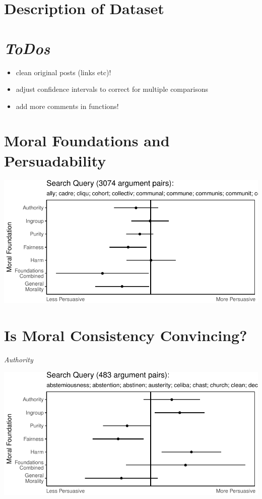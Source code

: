 \documentclass[11pt,]{article}
\providecommand{\tightlist}{%
\setlength{\itemsep}{0pt}\setlength{\parskip}{0pt}}
\begin{document}
\section{Description of Dataset}\label{description-of-dataset}

\section{\texorpdfstring{\emph{ToDos}}{ToDos}}\label{todos}

\begin{itemize}
\tightlist
\item
  clean original posts (links etc)!
\item
  adjust confidence intervals to correct for multiple comparisons
\item
  add more comments in functions!
\end{itemize}

\section{Moral Foundations and
Persuadability}\label{moral-foundations-and-persuadability}

\includegraphics{prelim_files/figure-latex/unnamed-chunk-3-1.pdf}

\section{Is Moral Consistency
Convincing?}\label{is-moral-consistency-convincing}

\emph{Authority}

\includegraphics{prelim_files/figure-latex/unnamed-chunk-5-1.pdf}
\end{document}
